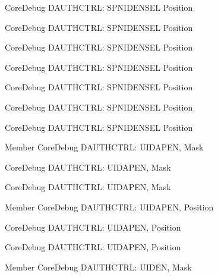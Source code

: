 \begin{DoxyRefList}
\label{deprecated__deprecated000435}%
%
Core\+Debug DAUTHCTRL\+: SPNIDENSEL Position 

\label{deprecated__deprecated000280}%
%
Core\+Debug DAUTHCTRL\+: SPNIDENSEL Position 

\label{deprecated__deprecated000217}%
%
Core\+Debug DAUTHCTRL\+: SPNIDENSEL Position 

\label{deprecated__deprecated000141}%
%
Core\+Debug DAUTHCTRL\+: SPNIDENSEL Position 

\label{deprecated__deprecated000538}%
%
Core\+Debug DAUTHCTRL\+: SPNIDENSEL Position 

\label{deprecated__deprecated000359}%
%
Core\+Debug DAUTHCTRL\+: SPNIDENSEL Position 

\label{deprecated__deprecated000087}%
%
Core\+Debug DAUTHCTRL\+: SPNIDENSEL Position  
\item[Member \doxylink{group__CMSIS__SCB_gad69e7195bbc5074466387d9c4d8bd529}{Core\+Debug\+\_\+\+DAUTHCTRL\+\_\+\+UIDAPEN\+\_\+\+Msk} ]\label{deprecated__deprecated000635}%
%
Core\+Debug DAUTHCTRL\+: UIDAPEN, Mask 

\label{deprecated__deprecated000533}%
%
Core\+Debug DAUTHCTRL\+: UIDAPEN, Mask 

\label{deprecated__deprecated000082}%
%
Core\+Debug DAUTHCTRL\+: UIDAPEN, Mask  
\item[Member \doxylink{group__CMSIS__SCB_ga57a2ef70f6cc1e0903a8c3740512de46}{Core\+Debug\+\_\+\+DAUTHCTRL\+\_\+\+UIDAPEN\+\_\+\+Pos} ]\label{deprecated__deprecated000634}%
%
Core\+Debug DAUTHCTRL\+: UIDAPEN, Position 

\label{deprecated__deprecated000081}%
%
Core\+Debug DAUTHCTRL\+: UIDAPEN, Position 

\label{deprecated__deprecated000532}%
%
Core\+Debug DAUTHCTRL\+: UIDAPEN, Position  
\item[Member \doxylink{group__CMSIS__SCB_ga7d84e1642469f5c20b7ef7fa76a4fe95}{Core\+Debug\+\_\+\+DAUTHCTRL\+\_\+\+UIDEN\+\_\+\+Msk} ]\label{deprecated__deprecated000531}%
%
Core\+Debug DAUTHCTRL\+: UIDEN, Mask 


\end{DoxyRefList}
